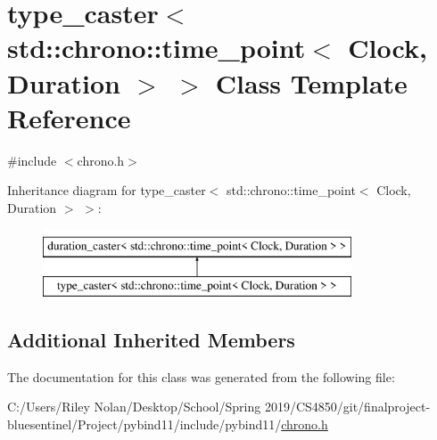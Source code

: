 \hypertarget{classtype__caster_3_01std_1_1chrono_1_1time__point_3_01_clock_00_01_duration_01_4_01_4}{}\section{type\+\_\+caster$<$ std\+::chrono\+::time\+\_\+point$<$ Clock, Duration $>$ $>$ Class Template Reference}
\label{classtype__caster_3_01std_1_1chrono_1_1time__point_3_01_clock_00_01_duration_01_4_01_4}


{\ttfamily \#include $<$chrono.\+h$>$}

Inheritance diagram for type\+\_\+caster$<$ std\+::chrono\+::time\+\_\+point$<$ Clock, Duration $>$ $>$\+:\begin{figure}[H]
\begin{center}
\leavevmode
\includegraphics[height=2.000000cm]{classtype__caster_3_01std_1_1chrono_1_1time__point_3_01_clock_00_01_duration_01_4_01_4}
\end{center}
\end{figure}
\subsection*{Additional Inherited Members}


The documentation for this class was generated from the following file\+:\begin{DoxyCompactItemize}
\item 
C\+:/\+Users/\+Riley Nolan/\+Desktop/\+School/\+Spring 2019/\+C\+S4850/git/finalproject-\/bluesentinel/\+Project/pybind11/include/pybind11/\mbox{\hyperlink{chrono_8h}{chrono.\+h}}\end{DoxyCompactItemize}

